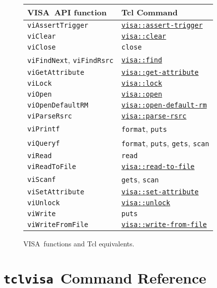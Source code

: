 \documentclass[12pt, a4paper]{report}
\newcommand{\tclvisa}{{\tt tclvisa }}
\newcommand{\VISA}{\mbox{VISA }}
\newcommand{\COMMANDREF}[1]{{\tt \hyperref[#1]{#1}}}
\newcommand{\VISACOMMANDREF}[1]{{\tt \mbox{#1}}\index{#1}}
\newcommand{\TCLCOMMANDREF}[1]{{\tt \mbox{#1}}\index{#1}}
\begin{document}
\begin{figure}
\caption{\VISA functions and Tcl equivalents.}
\label{tabCorrespondence}
\medskip
\begin{tabular}{ll}
\VISA API function & Tcl Command \\
\hline
\VISACOMMANDREF{viAssertTrigger} & \COMMANDREF{visa::assert-trigger}	\\
\VISACOMMANDREF{viClear} & \COMMANDREF{visa::clear}	\\
\VISACOMMANDREF{viClose} & \TCLCOMMANDREF{close}	\\
\VISACOMMANDREF{viFindNext}, \VISACOMMANDREF{viFindRsrc} & \COMMANDREF{visa::find}	\\
\VISACOMMANDREF{viGetAttribute} & \COMMANDREF{visa::get-attribute}	\\
\VISACOMMANDREF{viLock} & \COMMANDREF{visa::lock}	\\
\VISACOMMANDREF{viOpen} & \COMMANDREF{visa::open}	\\
\VISACOMMANDREF{viOpenDefaultRM} & \COMMANDREF{visa::open-default-rm}	\\
\VISACOMMANDREF{viParseRsrc} & \COMMANDREF{visa::parse-rsrc}	\\
\VISACOMMANDREF{viPrintf} & \TCLCOMMANDREF{format}, \TCLCOMMANDREF{puts}	\\
\VISACOMMANDREF{viQueryf} & \TCLCOMMANDREF{format}, \TCLCOMMANDREF{puts}, \TCLCOMMANDREF{gets}, \TCLCOMMANDREF{scan}	\\
\VISACOMMANDREF{viRead} & \TCLCOMMANDREF{read}	\\
\VISACOMMANDREF{viReadToFile} & \COMMANDREF{visa::read-to-file}	\\
\VISACOMMANDREF{viScanf} & \TCLCOMMANDREF{gets}, \TCLCOMMANDREF{scan}	\\
\VISACOMMANDREF{viSetAttribute} & \COMMANDREF{visa::set-attribute}	\\
\VISACOMMANDREF{viUnlock} & \COMMANDREF{visa::unlock}	\\
\VISACOMMANDREF{viWrite} & \TCLCOMMANDREF{puts}	\\
\VISACOMMANDREF{viWriteFromFile} & \COMMANDREF{visa::write-from-file}	\\
\end{tabular}
\end{figure}

\chapter{\tclvisa Command Reference}
\end{document}
